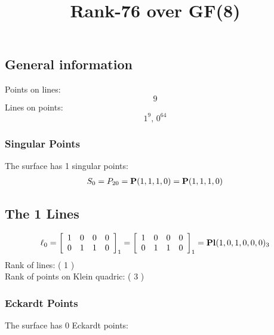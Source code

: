 \documentclass{article}
\newcommand\setTBstruts{\def\T{\rule{0pt}{2.6ex}}%
\def\B{\rule[-1.2ex]{0pt}{0pt}}}
\newcommand{\bP}{{\bf P}}
\begin{document}
 
\setTBstruts



{\allowdisplaybreaks%






\title{Rank-76 over GF(8)}
\author{}%
\maketitle%
%
{}



\subsection*{General information}
Points on lines:
$$
9$$
Lines on points:
$$
1^9,\,0^{64}$$
\subsubsection*{Singular Points}
The surface has 1 singular points:\\
\begin{align*}
S_{0} &= P_{20}=\bP(1, 1, 1, 0) = \bP(1, 1, 1, 0)\\
\end{align*}
\subsection*{The 1 Lines}
$$
\ell_{0} = 
\left[
\begin{array}{*{4}{r}}
1 & 0 & 0 & 0\\
0 & 1 & 1 & 0\\
\end{array}
\right]
_{1}
=
\left[
\begin{array}{*{4}c}
1  & 0  & 0  & 0\\
0  & 1  & 1  & 0\\
\end{array}
\right]_{1}
={\rm\bf Pl}(1,0,1,0,0,0 )_{3}$$
Rank of lines: ( 1 )\\
Rank of points on Klein quadric: ( 3 )\\
\subsubsection*{Eckardt Points}
The surface has 0 Eckardt points:\\
}
\end{document}
